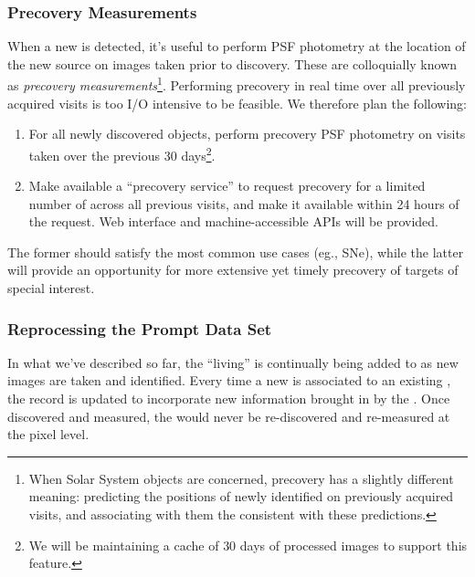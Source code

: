 \documentclass[SE,lsstdraft,toc]{lsstdoc}
\begin{document}
\subsubsection{Precovery Measurements}

When a new \DIASource is detected, it's useful to perform  PSF photometry at the location of the new source on images taken prior to discovery. These are colloquially known as \emph{precovery measurements}\footnote{When Solar System objects are concerned, precovery has a slightly different meaning: predicting the positions of newly identified \SSObjects on previously acquired visits, and associating with them the \DIASources consistent with these predictions.}. Performing precovery in real time over all previously acquired visits is too I/O intensive to be feasible. We therefore plan the following:
\begin{enumerate}
\item For all newly discovered objects, perform precovery PSF photometry on visits taken over the previous 30 days\footnote{We will be maintaining a cache of $30$ days of processed images to support this feature.}.  
\item Make available a ``precovery service'' to request precovery for a limited number of \DIASources across all previous visits, and make it available within 24 hours of the request. Web interface and machine-accessible APIs will be provided.
\end{enumerate}

The former should satisfy the most common use cases (eg., SNe), while the latter will provide an opportunity for more extensive yet timely precovery of targets of special interest.

\subsubsection{Reprocessing the Prompt Data Set}
\label{sec:l1dbreproc}

In what we've described so far, the ``living'' \DB is continually being added to as new images are taken and \DIASources identified. Every time a new \DIASource is associated to an existing \DIAObject, the \DIAObject record is updated to incorporate new information brought in by the \DIASource. Once discovered and measured, the \DIASources would never be re-discovered and re-measured at the pixel level.
\end{document}
